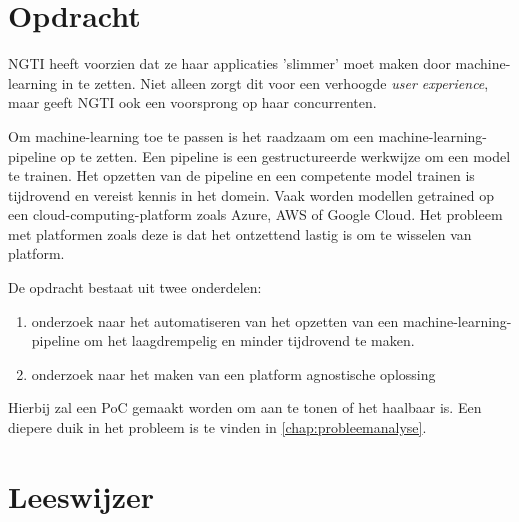 \section{Opdracht}
\label{sec:opdracht}
NGTI heeft voorzien dat ze haar applicaties 'slimmer' moet maken door \gls{machine-learning} in te zetten. Niet alleen zorgt dit voor een verhoogde \textit{user experience}, maar geeft NGTI ook een voorsprong op haar concurrenten.

Om \gls{machine-learning} toe te passen is het raadzaam om een \gls{machine-learning-pipeline} op te zetten. Een pipeline is een gestructureerde werkwijze om een model te trainen. Het opzetten van de pipeline en een competente model trainen is tijdrovend en vereist kennis in het domein. Vaak worden modellen getrained op een \gls{cloud-computing-platform} zoals Azure, AWS of Google Cloud. Het probleem met platformen zoals deze is dat het ontzettend lastig is om te wisselen van platform.\bigskip\bigskip\bigskip\bigskip\bigskip

De opdracht bestaat uit twee onderdelen:
\begin{enumerate}
  \item onderzoek naar het automatiseren van het opzetten van een \gls{machine-learning-pipeline} om het laagdrempelig en minder tijdrovend te maken.
  \item onderzoek naar het maken van een platform agnostische oplossing
\end{enumerate}

Hierbij zal een PoC gemaakt worden om aan te tonen of het haalbaar is. Een diepere duik in het probleem is te vinden in \autoref{chap:probleemanalyse}.

\section{Leeswijzer}
\label{sec:leeswijzer}
